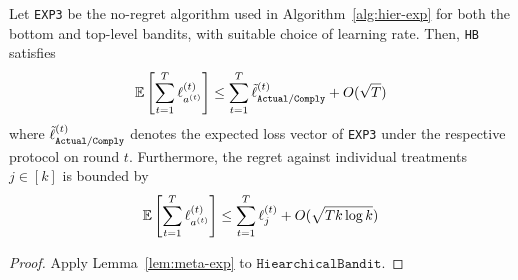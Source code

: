 \begin{thm}\label{thm:cexp}\eod
	Let \texttt{EXP3} be the no-regret algorithm used in Algorithm~\ref{alg:hier-exp} for both the bottom and top-level bandits, with suitable choice of learning rate. Then, \texttt{HB} satisfies
	\begin{equation}
		\operatorname*{\mathbb E}\left[\sum_{t=1}^T\ell^{(t)}_{a^{(t)}}\right]
		\leq \sum_{t=1}^T \tilde{\ell}^{(t)}_{{\texttt{Actual}}/{\texttt{Comply}}}
		+ O(\sqrt{T})
	\end{equation}
	where $\tilde{\ell}^{(t)}_{{\texttt{Actual}}/{\texttt{Comply}}}$ denotes the expected loss vector of \texttt{EXP3} under the respective protocol on round $t$. 
	Furthermore, the regret against individual treatments $j\in[k]$ is bounded by
	\begin{equation}
		\operatorname*{\mathbb E}\left[\sum_{t=1}^{T} \ell^{(t)}_{a^{(t)}}\right]
		\leq \sum_{t=1}^T\ell^{(t)}_{j}
		+ O(\sqrt{T k\log k})
	\end{equation}
\end{thm}

\begin{proof}
	Apply Lemma~\ref{lem:meta-exp} to $\texttt{HiearchicalBandit}$.
\end{proof}



